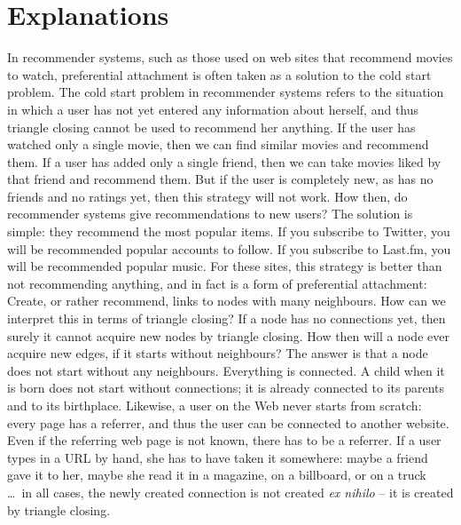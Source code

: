 \documentclass{jimis-final-en}
\begin{document}
\section{Explanations}
In recommender systems, such as those used on web sites that recommend movies to
watch, preferential attachment is often taken as a solution to the cold
start problem.  The cold start problem in recommender systems refers to
the situation in which a user has not yet entered any information about
herself, and thus triangle closing cannot be used to recommend her
anything.  If the user has watched only a single movie, then we can find
similar movies and recommend them.  If a user has added only a single
friend, then we can take movies liked by that friend and recommend them.
But if the user is completely new, as has no friends and no ratings yet,
then this strategy will not work.  How then, do recommender systems give
recommendations to new users?  The solution is simple: they recommend
the most popular items.  If you subscribe to Twitter, you will be
recommended popular accounts to follow.  If you subscribe to Last.fm,
you will be recommended popular music.  For these sites, this strategy
is better than not recommending anything, and in fact is a form of
preferential attachment: Create, or rather recommend, links to nodes
with many neighbours.  How can we interpret this in terms of triangle
closing?  If a node has no connections yet, then surely it cannot
acquire new nodes by triangle closing.  How then will a node ever
acquire new edges, if it starts without neighbours?  The answer is that
a node does not start without any neighbours.  Everything is connected.
A child when it is born does not start without connections; it is
already connected to its parents and to its birthplace.  Likewise, a
user on the Web never starts from scratch: every page has a referrer,
and thus the user can be connected to another website.  Even if the
referring web page is not known, there has to be a referrer.  If a user
types in a URL by hand, she has to have taken it somewhere: maybe a
friend gave it to her, maybe she read it
in a magazine, on a billboard, or on a truck \ldots\ in all cases, the
newly created connection is not created \emph{ex nihilo} -- it is created
by triangle closing.
\end{document}
